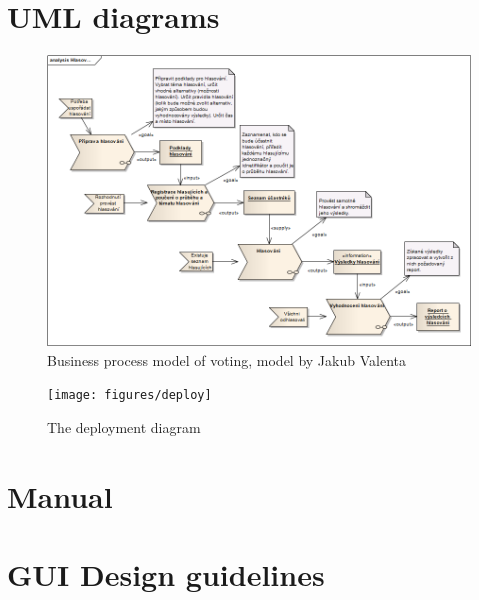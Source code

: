 \documentclass[11pt,twoside,a4paper]{book}
\begin{document}
\chapter{UML diagrams}
\begin{figure}[v]
\begin{center}
\includegraphics[width=14cm]{figures/VotingCZECH}
\caption{Business process model of voting, model by Jakub Valenta}
\label{fig:businessMOD}
\end{center}
\end{figure}

\begin{figure}[h]
\begin{center}
\texttt{[image: figures/deploy]}
\caption{The deployment diagram}
\label{fig:deployment}
\end{center}
\end{figure}

\chapter{Manual}

\chapter{GUI Design guidelines}

\end{document}
